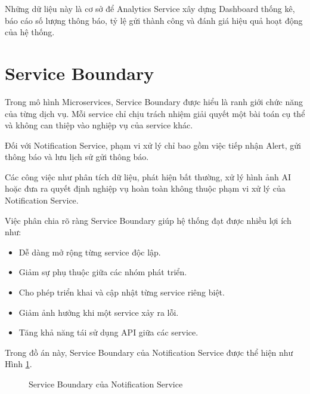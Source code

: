 Những dữ liệu này là cơ sở để Analytics Service xây dựng Dashboard thống kê, báo cáo số lượng thông báo, tỷ lệ gửi thành công và đánh giá hiệu quả hoạt động của hệ thống.


\section{Service Boundary}

Trong mô hình Microservices, Service Boundary được hiểu là ranh giới chức năng của từng dịch vụ. Mỗi service chỉ chịu trách nhiệm giải quyết một bài toán cụ thể và không can thiệp vào nghiệp vụ của service khác.

Đối với Notification Service, phạm vi xử lý chỉ bao gồm việc tiếp nhận Alert, gửi thông báo và lưu lịch sử gửi thông báo.

Các công việc như phân tích dữ liệu, phát hiện bất thường, xử lý hình ảnh AI hoặc đưa ra quyết định nghiệp vụ hoàn toàn không thuộc phạm vi xử lý của Notification Service.

Việc phân chia rõ ràng Service Boundary giúp hệ thống đạt được nhiều lợi ích như:

\begin{itemize}
\item Dễ dàng mở rộng từng service độc lập.
\item Giảm sự phụ thuộc giữa các nhóm phát triển.
\item Cho phép triển khai và cập nhật từng service riêng biệt.
\item Giảm ảnh hưởng khi một service xảy ra lỗi.
\item Tăng khả năng tái sử dụng API giữa các service.
\end{itemize}

Trong đồ án này, Service Boundary của Notification Service được thể hiện như Hình \ref{fig:service-boundary}.

\begin{figure}[H]
\centering
{}
\caption{Service Boundary của Notification Service}
\label{fig:service-boundary}
\end{figure}

